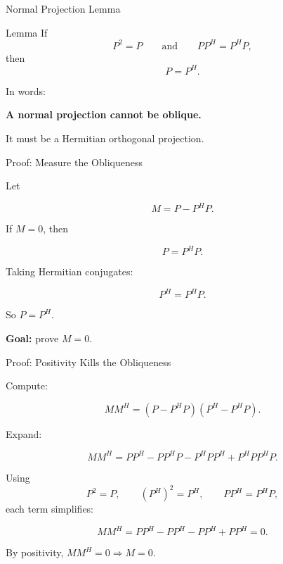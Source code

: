 \documentclass[10pt]{beamer}
\theoremstyle{definition}
\newcommand{\x}[1]{\alert{\textbf{#1}}}
\begin{document}
\begin{frame}{Normal Projection Lemma}

\begin{block}{Lemma}
If
$$
P^2=P
\qquad\text{and}\qquad
PP^H=P^HP,
$$
then
$$
P=P^H.
$$
\end{block}

\vfill\pause

In words:

\begin{center}
\x{A normal projection cannot be oblique.}
\end{center}

\vfill

It must be a Hermitian orthogonal projection.

\end{frame}


\begin{frame}{Proof: Measure the Obliqueness}

Let

$$
M=P-P^HP.
$$

\vfill

If $M=0$, then

$$
P=P^HP.
$$

\vfill\pause

Taking Hermitian conjugates:

$$
P^H=P^HP.
$$

\vfill

So $P=P^H$.

\vfill

\x{Goal:} prove $M=0$.

\end{frame}


\begin{frame}[shrink=6]{Proof: Positivity Kills the Obliqueness}

Compute:

$$
MM^H
=(P-P^HP)(P^H-P^HP).
$$

\vfill\pause

Expand:

$$
MM^H
=PP^H-PP^HP-P^HPP^H+P^HPP^HP.
$$

\vfill\pause

Using
$$
P^2=P,\qquad (P^H)^2=P^H,\qquad PP^H=P^HP,
$$
each term simplifies:

$$
MM^H=PP^H-PP^H-PP^H+PP^H=0.
$$

\vfill

By positivity, $MM^H=0\Rightarrow M=0$.

\end{frame}
\end{document}
